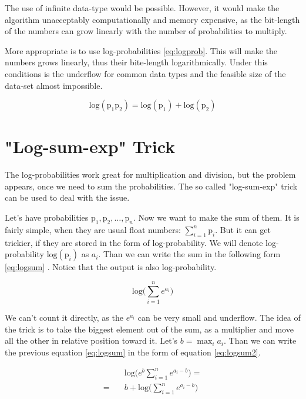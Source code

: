 \documentclass[thesis=M,english]{FITthesis}[2012/10/20]
\begin{document}
The use of infinite data-type would be possible. However, it would make the algorithm unacceptably computationally and memory expensive, as the bit-length of the numbers can grow linearly with the number of probabilities to multiply.

More appropriate is to use log-probabilities \eqref{eq:logprob}. This will make the numbers grows linearly, thus their bite-length logarithmically. Under this conditions is the underflow for common data types and the feasible size of the data-set almost impossible.

\begin{equation}\label{eq:logprob}
\mathrm{log}(\mathrm{p}_1\mathrm{p}_2) = \mathrm{log}(\mathrm{p}_1) + \mathrm{log}(\mathrm{p}_2)
\end{equation}   

\section{"Log-sum-exp" Trick}

The log-probabilities work great for multiplication and division, but the problem appears, once we need to sum the probabilities. The so called "log-sum-exp" trick can be used to deal with the issue. 

Let's have probabilities $ \mathrm{p}_1, \mathrm{p}_2, \dots ,\mathrm{p}_n $. Now we want to make the sum of them. It is fairly simple, when they are usual float numbers: $\sum_{i=1}^n \mathrm{p}_i$. But it can get trickier, if they are stored in the form of log-probability. We will denote log-probability $\mathrm{log}( \mathrm{p}_i )$ as $a_i$. Than we can write the sum in the following form \eqref{eq:logsum} . Notice that the output is also log-probability.

\begin{equation}\label{eq:logsum}
\mathrm{log} \big( \sum_{i=1}^n e^{a_i} \big)
\end{equation}

We can't count it directly, as the $e^{a_i}$ can be very small and underflow. The idea of the trick is to take the biggest element out of the sum, as a multiplier and move all the other in relative position toward it.
Let's $b = \max_{i} a_i$. Than we can write the previous equation \eqref{eq:logsum} in the form of equation \eqref{eq:logsum2}. 

\begin{equation}\label{eq:logsum2}
\begin{aligned}
&\mathrm{log} \big( e^b \sum_{i=1}^n e^{a_i - b } \big) = \\
 = \quad &  b + \mathrm{log} \big( \sum_{i=1}^n e^{a_i - b } \big)
\end{aligned}
\end{equation}
\end{document}
